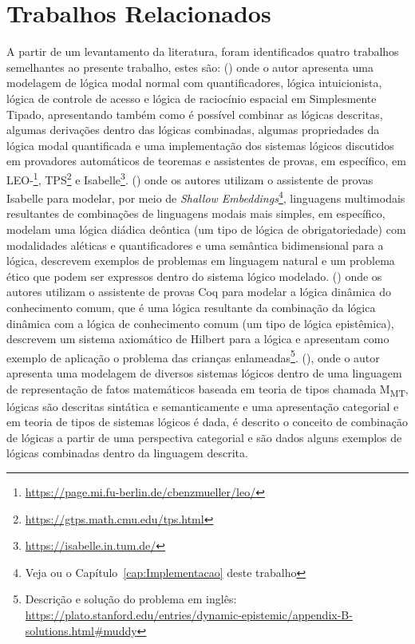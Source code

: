 	\section{Trabalhos Relacionados}
		A partir de um levantamento da literatura, foram identificados quatro trabalhos semelhantes ao presente trabalho, estes são:
		 (\citeyear{benzmuller2010combining}) onde o autor apresenta uma modelagem de lógica modal normal
		com quantificadores, lógica intuicionista, lógica de controle de acesso e lógica de raciocínio espacial em \CalcLambda Simplesmente Tipado,
		apresentando também como é possível combinar as lógicas descritas, algumas derivações dentro das lógicas combinadas, algumas propriedades da lógica modal quantificada
		e uma implementação dos sistemas lógicos discutidos em provadores automáticos de teoremas e assistentes de provas, em específico, em
		LEO-\MakeUppercase{}\footnote{\url{https://page.mi.fu-berlin.de/cbenzmueller/leo/}}, TPS\footnote{\url{https://gtps.math.cmu.edu/tps.html}}
		e Isabelle\footnote{\url{https://isabelle.in.tum.de/}}.
		 (\citeyear{fuenmayor2019mechanised}) onde os autores utilizam
		o assistente de provas Isabelle para modelar, por meio de \textit{Shallow Embeddings}\footnote{Veja \cite{azurat2002survey} ou o Capítulo~\ref{cap:Implementacao} deste trabalho},
		linguagens multimodais resultantes de combinações de linguagens modais mais simples, em específico, modelam uma lógica diádica deôntica (um tipo de lógica de obrigatoriedade)
		com modalidades aléticas e quantificadores e uma semântica bidimensional para a lógica, descrevem exemplos de problemas em linguagem natural e um problema ético
		que podem ser expressos dentro do sistema lógico modelado.
		 (\citeyear{lescanne2007dynamic}) onde os autores utilizam o assistente
		de provas Coq para modelar a lógica dinâmica do conhecimento comum, que é uma lógica resultante da combinação da lógica dinâmica com a lógica de conhecimento
		comum (um tipo de lógica epistêmica), descrevem um sistema axiomático de Hilbert para a lógica e apresentam como exemplo de aplicação o problema das crianças
		enlameadas\footnote{Descrição e solução do problema em inglês: \url{https://plato.stanford.edu/entries/dynamic-epistemic/appendix-B-solutions.html\#muddy}}.
		 (\citeyear{rabe2017identify}), onde o autor apresenta uma modelagem de diversos sistemas lógicos dentro de uma linguagem
		de representação de fatos matemáticos baseada em teoria de tipos chamada M\textsubscript{MT}, lógicas são descritas sintática e semanticamente e uma apresentação
		categorial e em teoria de tipos de sistemas lógicos é dada, é descrito o conceito de combinação de lógicas a partir de uma perspectiva categorial e são dados
		alguns exemplos de lógicas combinadas dentro da linguagem descrita.

